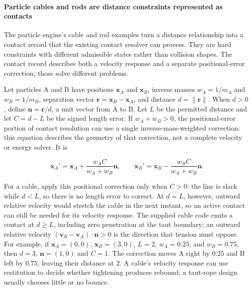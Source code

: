 \paragraph{Particle cables and rods are distance constraints represented as contacts}\label{06-engine-ii-ch033-particle-cables-and-rods-are-distance-constraints-represented-as-contacts}

\hypertarget{06-engine-ii-ch033-particle-cables-and-rods-are-distance-constraints-represented-as-contacts}{}

The particle engine's cable and rod examples turn a distance relationship into a contact record that the existing contact resolver can process. They are hard constraints with different admissible states rather than collision shapes. The contact record describes both a velocity response and a separate positional-error correction; those solve different problems.

Let particles A and B have positions \(\mathbf{x}_A\) and \(\mathbf{x}_B\), inverse masses \(w_A=1/m_A\) and \(w_B=1/m_B\), separation vector \(\mathbf{r}=\mathbf{x}_B-\mathbf{x}_A\), and distance \(d=\lVert\mathbf{r}\rVert\). When \(d>0\), define \(\mathbf{n}=\mathbf{r}/d\), a unit vector from A to B. Let \(L\) be the permitted distance and let \(C=d-L\) be the signed length error. If \(w_A+w_B>0\), the positional-error portion of contact resolution can use a single inverse-mass-weighted correction: this equation describes the geometry of that correction, not a complete velocity or energy solver. It is

\[
\mathbf{x}_A' = \mathbf{x}_A + \frac{w_A C}{w_A+w_B}\mathbf{n}, \qquad
\mathbf{x}_B' = \mathbf{x}_B - \frac{w_B C}{w_A+w_B}\mathbf{n}.
\]

For a cable, apply this positional correction only when \(C>0\): the line is slack while \(d<L\), so there is no length error to correct. At \(d=L\), however, outward relative velocity would stretch the cable in the next instant, so an active contact can still be needed for its velocity response. The supplied cable code emits a contact at \(d\geq L\), including zero penetration at the taut boundary; an outward relative velocity \((\mathbf v_B-\mathbf v_A)\cdot\mathbf n>0\) is the direction that tension must oppose. For example, if \(\mathbf{x}_A=(0,0)\), \(\mathbf{x}_B=(3,0)\), \(L=2\), \(w_A=0.25\), and \(w_B=0.75\), then \(d=3\), \(\mathbf{n}=(1,0)\) and \(C=1\). The correction moves A right by \(0.25\) and B left by \(0.75\), leaving their distance at \(2\). A cable's velocity response can use restitution to decide whether tightening produces rebound; a taut-rope design usually chooses little or no bounce.


